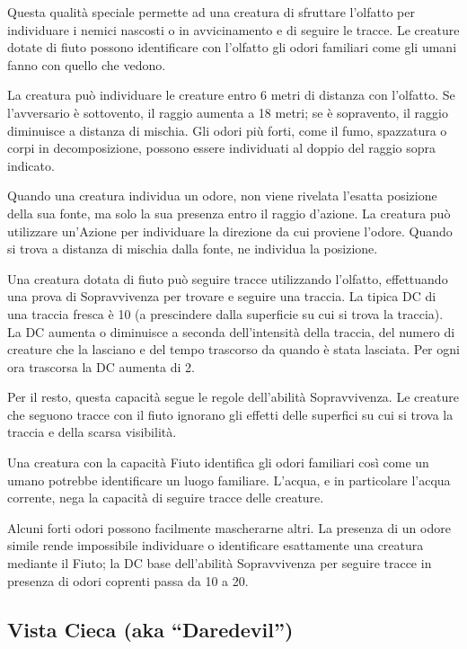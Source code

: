 \documentclass[a4paper,11pt,twoside,openany]{book}
\begin{document}
Questa qualità speciale permette ad una creatura di sfruttare l'olfatto per individuare i nemici nascosti o in avvicinamento e di seguire le tracce. Le creature dotate di fiuto possono identificare con l'olfatto gli odori familiari come gli umani fanno con quello che vedono.

La creatura può individuare le creature entro 6 metri di distanza con l'olfatto. Se l'avversario è sottovento, il raggio aumenta a 18 metri; se è sopravento, il raggio diminuisce a distanza di mischia.
Gli odori più forti, come il fumo, spazzatura o corpi in decomposizione, possono essere individuati al doppio del raggio sopra indicato.

Quando una creatura individua un odore, non viene rivelata l'esatta posizione della sua fonte, ma solo la sua presenza entro il raggio d'azione. La creatura può utilizzare un'Azione per individuare la direzione da cui proviene l'odore. Quando si trova a distanza di mischia dalla fonte, ne individua la posizione.

Una creatura dotata di fiuto può seguire tracce utilizzando l'olfatto, effettuando una prova di Sopravvivenza per trovare e seguire una traccia. La tipica DC di una traccia fresca è 10 (a prescindere dalla superficie su cui si trova la traccia). La DC aumenta o diminuisce a seconda dell'intensità della traccia, del numero di creature che la lasciano e del tempo trascorso da quando è stata lasciata. Per ogni ora trascorsa la DC aumenta di 2.

Per il resto, questa capacità segue le regole dell'abilità Sopravvivenza. Le creature che seguono tracce con il fiuto ignorano gli effetti delle superfici su cui si trova la traccia e della scarsa visibilità.

Una creatura con la capacità Fiuto identifica gli odori familiari così come un umano potrebbe identificare un luogo familiare. L'acqua, e in particolare l'acqua corrente, nega la capacità di seguire tracce delle creature.

Alcuni forti odori possono facilmente mascherarne altri. La presenza di un odore simile rende impossibile individuare o identificare esattamente una creatura mediante il Fiuto; la DC base dell'abilità Sopravvivenza per seguire tracce in presenza di odori coprenti passa da 10 a 20.


\subsection{Vista Cieca (aka “Daredevil”)}
\end{document}
